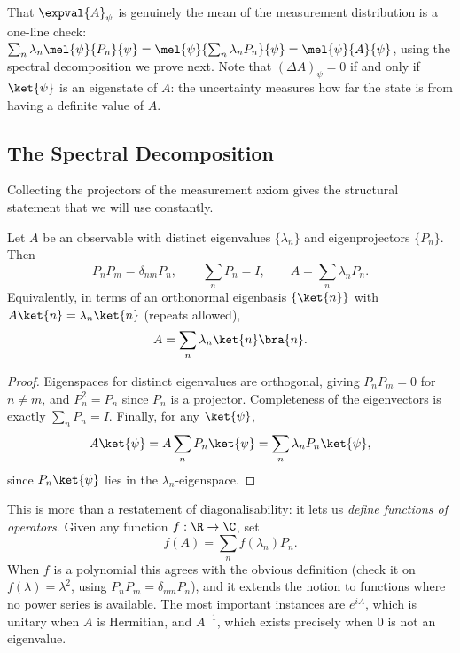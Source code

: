 That $\expval{A}_\psi$ is genuinely the mean of the measurement distribution is a one-line check: $\sum_n \lambda_n \mel{\psi}{P_n}{\psi} = \mel{\psi}{\sum_n \lambda_n P_n}{\psi} = \mel{\psi}{A}{\psi}$, using the spectral decomposition we prove next. Note that $(\Delta A)_\psi = 0$ if and only if $\ket{\psi}$ is an eigenstate of $A$: the uncertainty measures how far the state is from having a definite value of $A$.

\subsection{The Spectral Decomposition}

Collecting the projectors of the measurement axiom gives the structural statement that we will use constantly.

\begin{theorem}
    Let $A$ be an observable with distinct eigenvalues $\{\lambda_n\}$ and eigenprojectors $\{P_n\}$. Then
    $$
    P_n P_m = \delta_{nm} P_n, \qquad \sum_n P_n = I, \qquad A = \sum_n \lambda_n P_n.
    $$
    Equivalently, in terms of an orthonormal eigenbasis $\{\ket{n}\}$ with $A\ket{n} = \lambda_n \ket{n}$ (repeats allowed),
    $$
    A = \sum_n \lambda_n \ket{n}\bra{n}.
    $$
\end{theorem}
\begin{proof}
    Eigenspaces for distinct eigenvalues are orthogonal, giving $P_nP_m = 0$ for $n \neq m$, and $P_n^2 = P_n$ since $P_n$ is a projector. Completeness of the eigenvectors is exactly $\sum_n P_n = I$. Finally, for any $\ket{\psi}$,
    $$
    A\ket{\psi} = A \sum_n P_n \ket{\psi} = \sum_n \lambda_n P_n \ket{\psi},
    $$
    since $P_n\ket{\psi}$ lies in the $\lambda_n$-eigenspace. \qedhere
\end{proof}

This is more than a restatement of diagonalisability: it lets us \emph{define functions of operators}. Given any function $f : \R \to \C$, set
$$
f(A) = \sum_n f(\lambda_n) P_n.
$$
When $f$ is a polynomial this agrees with the obvious definition (check it on $f(\lambda) = \lambda^2$, using $P_nP_m = \delta_{nm}P_n$), and it extends the notion to functions where no power series is available. The most important instances are $e^{iA}$, which is unitary when $A$ is Hermitian, and $A^{-1}$, which exists precisely when $0$ is not an eigenvalue.

